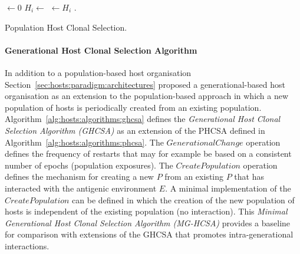 \begin{algorithm}[htp]
  \SetLine
  
	\KwOut{\Pop} 	
	
	\Pop $\leftarrow$0\;
	{
		$H_i \leftarrow$ \CreateHost{}\;
		\Pop $\leftarrow H_i$\;
	}
	\While{$\neg$\StopCondition{}}
	{
		\Env.\Exposure{\Pop}\;
		\HostInteractions{\Pop}\;
	}
	\Return{\Pop}\;
	\caption{Population Host Clonal Selection.}
	\label{alg:hosts:algorithms:phcsa}
\end{algorithm}

%
%
\paragraph{Generational Host Clonal Selection Algorithm}
In addition to a population-based host organisation Section~\ref{sec:hosts:paradigm:architectures} proposed a generational-based host organisation as an extension to the population-based approach in which a new population of hosts is periodically created from an existing population. Algorithm~\ref{alg:hosts:algorithms:ghcsa} defines the \emph{Generational Host Clonal Selection Algorithm (GHCSA)} as an extension of the PHCSA defined in Algorithm~\ref{alg:hosts:algorithms:phcsa}. The $GenerationalChange$ operation defines the frequency of restarts that may for example be based on a consistent number of epochs (population exposures). The $CreatePopulation$ operation defines the mechanism for creating a new $P$ from an existing $P$ that has interacted with the antigenic environment $E$.
A minimal implementation of the $CreatePopulation$ can be defined in which the creation of the new population of hosts is independent of the existing population (no interaction). This \emph{Minimal Generational Host Clonal Selection Algorithm (MG-HCSA)} provides a baseline for comparison with extensions of the GHCSA that promotes intra-generational interactions.

